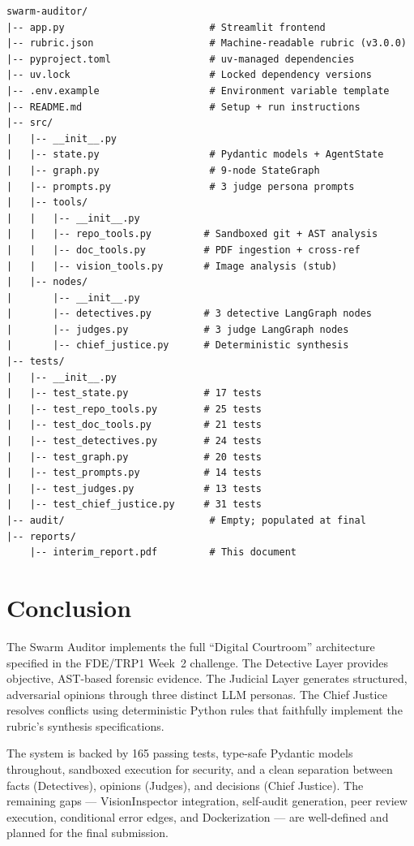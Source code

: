 \documentclass[12pt,a4paper]{article}
\begin{document}
\begin{lstlisting}[language={}, caption={Repository file tree}]
swarm-auditor/
|-- app.py                         # Streamlit frontend
|-- rubric.json                    # Machine-readable rubric (v3.0.0)
|-- pyproject.toml                 # uv-managed dependencies
|-- uv.lock                        # Locked dependency versions
|-- .env.example                   # Environment variable template
|-- README.md                      # Setup + run instructions
|-- src/
|   |-- __init__.py
|   |-- state.py                   # Pydantic models + AgentState
|   |-- graph.py                   # 9-node StateGraph
|   |-- prompts.py                 # 3 judge persona prompts
|   |-- tools/
|   |   |-- __init__.py
|   |   |-- repo_tools.py         # Sandboxed git + AST analysis
|   |   |-- doc_tools.py          # PDF ingestion + cross-ref
|   |   |-- vision_tools.py       # Image analysis (stub)
|   |-- nodes/
|       |-- __init__.py
|       |-- detectives.py         # 3 detective LangGraph nodes
|       |-- judges.py             # 3 judge LangGraph nodes
|       |-- chief_justice.py      # Deterministic synthesis
|-- tests/
|   |-- __init__.py
|   |-- test_state.py             # 17 tests
|   |-- test_repo_tools.py        # 25 tests
|   |-- test_doc_tools.py         # 21 tests
|   |-- test_detectives.py        # 24 tests
|   |-- test_graph.py             # 20 tests
|   |-- test_prompts.py           # 14 tests
|   |-- test_judges.py            # 13 tests
|   |-- test_chief_justice.py     # 31 tests
|-- audit/                         # Empty; populated at final
|-- reports/
    |-- interim_report.pdf         # This document
\end{lstlisting}


\section{Conclusion}

The Swarm Auditor implements the full ``Digital Courtroom'' architecture specified in the FDE/TRP1 Week~2 challenge. The Detective Layer provides objective, AST-based forensic evidence. The Judicial Layer generates structured, adversarial opinions through three distinct LLM personas. The Chief Justice resolves conflicts using deterministic Python rules that faithfully implement the rubric's synthesis specifications.

The system is backed by 165 passing tests, type-safe Pydantic models throughout, sandboxed execution for security, and a clean separation between facts (Detectives), opinions (Judges), and decisions (Chief Justice). The remaining gaps --- VisionInspector integration, self-audit generation, peer review execution, conditional error edges, and Dockerization --- are well-defined and planned for the final submission.
\end{document}
